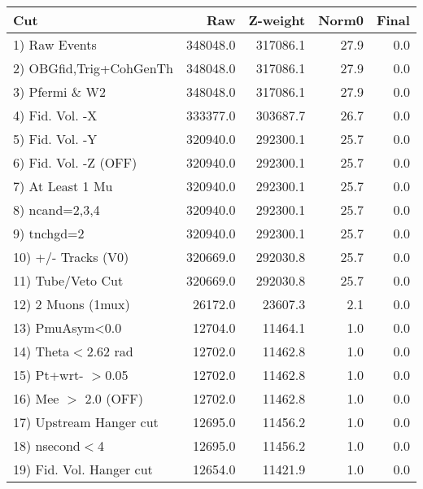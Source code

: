  \begin{table}[h!]\centering
 \begin{tabular}{||l||r|r|r|r||}
 \hline
 \hline
 Cut & Raw & Z-weight & Norm0 & Final \\
 \hline
  1) Raw Events           &    348048.0 &    317086.1 &        27.9 &         0.0 \\
  2) OBGfid,Trig+CohGenTh &    348048.0 &    317086.1 &        27.9 &         0.0 \\
  3) Pfermi \& W2         &    348048.0 &    317086.1 &        27.9 &         0.0 \\
  4) Fid. Vol. -X         &    333377.0 &    303687.7 &        26.7 &         0.0 \\
  5) Fid. Vol. -Y         &    320940.0 &    292300.1 &        25.7 &         0.0 \\
  6) Fid. Vol. -Z (OFF)   &    320940.0 &    292300.1 &        25.7 &         0.0 \\
  7) At Least 1 Mu        &    320940.0 &    292300.1 &        25.7 &         0.0 \\
  8) ncand=2,3,4          &    320940.0 &    292300.1 &        25.7 &         0.0 \\
  9) tnchgd=2             &    320940.0 &    292300.1 &        25.7 &         0.0 \\
 10) +/- Tracks (V0)      &    320669.0 &    292030.8 &        25.7 &         0.0 \\
 11) Tube/Veto Cut        &    320669.0 &    292030.8 &        25.7 &         0.0 \\
 12) 2 Muons (1mux)       &     26172.0 &     23607.3 &         2.1 &         0.0 \\
 13) PmuAsym<0.0          &     12704.0 &     11464.1 &         1.0 &         0.0 \\
 14) Theta$<$2.62 rad     &     12702.0 &     11462.8 &         1.0 &         0.0 \\
 15) Pt+wrt- $>$0.05      &     12702.0 &     11462.8 &         1.0 &         0.0 \\
 16) Mee $>$ 2.0  (OFF)   &     12702.0 &     11462.8 &         1.0 &         0.0 \\
 17) Upstream Hanger cut  &     12695.0 &     11456.2 &         1.0 &         0.0 \\
 18) nsecond$<$4          &     12695.0 &     11456.2 &         1.0 &         0.0 \\
 19) Fid. Vol. Hanger cut &     12654.0 &     11421.9 &         1.0 &         0.0 \\

\end{tabular}
\end{table}
